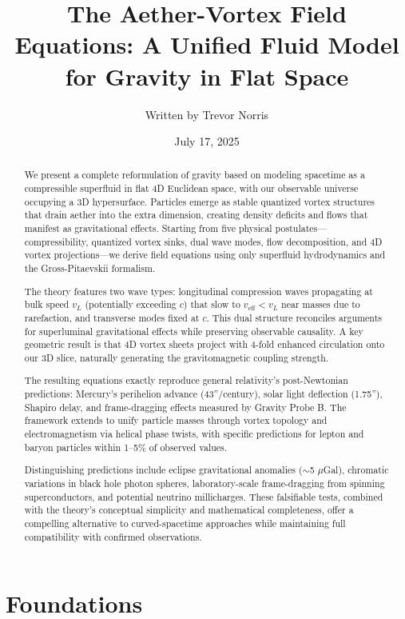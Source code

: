 \documentclass{article}
\title{The Aether-Vortex Field Equations: A Unified Fluid Model for Gravity in Flat Space}
\author{Written by Trevor Norris}
\date{July 17, 2025}
\begin{document}
\maketitle

\begin{abstract}
We present a complete reformulation of gravity based on modeling spacetime as a compressible superfluid in flat 4D Euclidean space, with our observable universe occupying a 3D hypersurface. Particles emerge as stable quantized vortex structures that drain aether into the extra dimension, creating density deficits and flows that manifest as gravitational effects. Starting from five physical postulates---compressibility, quantized vortex sinks, dual wave modes, flow decomposition, and 4D vortex projections---we derive field equations using only superfluid hydrodynamics and the Gross-Pitaevskii formalism.

The theory features two wave types: longitudinal compression waves propagating at bulk speed $v_L$ (potentially exceeding $c$) that slow to $v_{\text{eff}} < v_L$ near masses due to rarefaction, and transverse modes fixed at $c$. This dual structure reconciles arguments for superluminal gravitational effects while preserving observable causality. A key geometric result is that 4D vortex sheets project with 4-fold enhanced circulation onto our 3D slice, naturally generating the gravitomagnetic coupling strength.

The resulting equations exactly reproduce general relativity's post-Newtonian predictions: Mercury's perihelion advance (43''/century), solar light deflection (1.75''), Shapiro delay, and frame-dragging effects measured by Gravity Probe B. The framework extends to unify particle masses through vortex topology and electromagnetism via helical phase twists, with specific predictions for lepton and baryon particles within 1--5\% of observed values.

Distinguishing predictions include eclipse gravitational anomalies ($\sim$5 $\mu$Gal), chromatic variations in black hole photon spheres, laboratory-scale frame-dragging from spinning superconductors, and potential neutrino millicharges. These falsifiable tests, combined with the theory's conceptual simplicity and mathematical completeness, offer a compelling alternative to curved-spacetime approaches while maintaining full compatibility with confirmed observations.
\end{abstract}

\part{Foundations}
\end{document}
